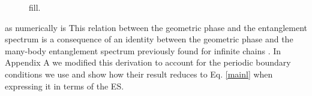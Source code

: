 \documentclass[twocolumn,amsmath,longbibliography,amssymb,superscriptaddress]{revtex4-1}
\begin{document}
\begin{figure}[h!]
\centering
{}\hspace{0mm}

\caption{fill. }
\label{bdi20}
\end{figure}
as numerically is
This relation between the geometric phase and the entanglement spectrum is a consequence of an identity between the geometric phase and the many-body entanglement spectrum previously found for infinite chains \cite{Zaletel2014}. In Appendix A we modified this derivation to account for the periodic boundary conditions we use and show how their result reduces to Eq. \ref{mainl} when expressing it in terms of the ES.


\begin{figure}[h]
\centering
{}
\caption{}
\label{disorder}
\end{figure}
\end{document}

